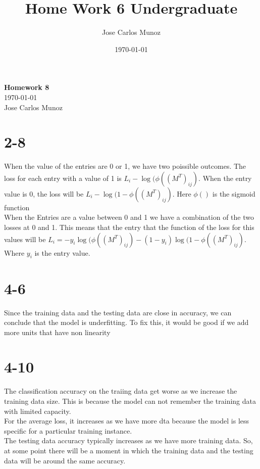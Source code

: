 \documentclass[12pt,english]{article}
\title{Home Work 6 Undergraduate}
\date{\today}
\author{Jose Carlos Munoz}
\begin{document}
\begin{center}
    \Large
    \textbf{Homework 8}\\
    \small
    \today\\
    \large
    Jose Carlos Munoz
\end{center}
\section*{2-8}
When the value of the entries are 0 or 1, we have two poissible outcomes. The loss for each entry with a value of 1 is $L_i-\log{(\phi ((M^T)_{ij})}$. When the entry value is 0, the loss will be $L_i-\log{( 1- \phi ((M^T)_{ij})}$. Here $\phi ()$ is the sigmoid function\\
When the Entries are a value between 0 and 1 we have a combination of the two losses at 0 and 1. This means that the entry that the function of the loss for this values will be $L_i = -y_i \log{(\phi ((M^T)_{ij}) -(1-y_i)\log{( 1- \phi ((M^T)_{ij})}}$. Where $y_i$ is the entry value.
\section*{4-6}
 Since the training data and the testing data are close in accuracy, we can conclude that the model is underfitting. To fix this, it would be good if we add more units that have non linearity
\section*{4-10}
The classification accuracy on the traiing data get worse as we increase the training data size. This is because the model can not remember the training data with limited capacity.\\
For the average loss, it increases  as we have more dta because the model is less specific for a particular training instance.\\
The testing data accuracy typically increases as we have more training data. So, at some point there will be a moment in which the training data and the testing data will be around the same accuracy.
\end{document}
